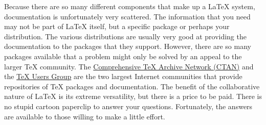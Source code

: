 Because there are so many different components that make up a \LaTeX{}
system, documentation is unfortunately very scattered.  The
information that you need may not be part of \LaTeX{} itself, but a
specific package or perhaps your distribution.  The various
distributions are usually very good at providing the documentation to
the packages that they support.  However, there are so many packages
available that a problem might only be solved by an appeal to the
larger \TeX{} community.  The \href{http://www.ctan.org}{Comprehensive
  \TeX{} Archive Network (CTAN)} and the
\href{http://www.tug.org}{\TeX{} Users Group} are the two largest
Internet communities that provide repositories of \TeX{} packages and
documentation.  The benefit of the collaborative nature of \LaTeX{} is
its extreme versatility, but there is a price to be paid.  There is no
stupid cartoon paperclip to answer your questions.  Fortunately, the
answers are available to those willing to make a little effort.


